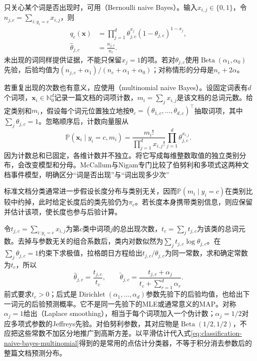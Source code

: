 只关心某个词是否出现时，可用（Bernoulli naive Bayes）。输入$x_{i,j}\in\{0,1\}$，令$n_{j,c}=\sum_{i:y_i=c}x_{i,j}$，则
\begin{equation}
  \label{eq:classification-naive-bayes-bernoulli}
  \begin{aligned}
    q_c(\bm{x})
      &=\prod_{j=1}^{d}
        \theta_{j,c}^{x_j}(1-\theta_{j,c})^{1-x_j},\\
    \hat\theta_{j,c}&=\frac{n_{j,c}}{n_c}.
  \end{aligned}
\end{equation}
未出现的词同样提供证据，不能只保留$x_j=1$的项。若对$\theta_{j,c}$使用$\operatorname{Beta}(\alpha_1,\alpha_0)$先验，后验均值为$(n_{j,c}+\alpha_1)/(n_c+\alpha_1+\alpha_0)$；对称情形的分母是$n_c+2\alpha$。

若重复出现的次数也有意义，应使用（multinomial naive Bayes）。设固定词表有$d$个词项，$\bm{x}_i\in\mathbb{N}_0^d$记录一篇文档的词项计数，$m_i=\sum_jx_{i,j}$是该文档的总词元数。给定类别和$m_i$，假设每个词元位置独立地按$\bm{\theta}_c=(\theta_{1,c},\ldots,\theta_{d,c})^{\top}$抽取词项，其中$\sum_j\theta_{j,c}=1$。忽略顺序后，计数向量服从
\begin{equation}
  \label{eq:classification-naive-bayes-multinomial}
  \mathbb{P}(\bm{x}_i\mid y_i=c,m_i)
  =\frac{m_i!}{\prod_{j=1}^{d}x_{i,j}!}
    \prod_{j=1}^{d}\theta_{j,c}^{x_{i,j}}.
\end{equation}
因为计数总和已固定，各维计数并不独立。将它写成每维整数取值的独立类别分布，会改变模型和分母。McCallum与Nigam专门比较了伯努利和多项式这两种文档事件模型，明确区分“词是否出现”与“词出现多少次”

标准文档分类通常进一步假设长度分布与类别无关，因而$\mathbb{P}(m_i\mid y_i=c)$在类别比较中约掉，此时给定长度后的类先验仍为$\pi_c$。若长度本身携带类别信息，则应保留并估计该项，使长度也参与后验计算。

令$t_{j,c}=\sum_{i:y_i=c}x_{i,j}$为第$c$类中词项$j$的总出现次数，$t_c=\sum_jt_{j,c}$为该类的总词元数。去掉与参数无关的组合系数后，类内对数似然为$\sum_jt_{j,c}\log\theta_{j,c}$。在$\sum_j\theta_{j,c}=1$约束下求极值，拉格朗日方程给出$t_{j,c}/\theta_{j,c}$为同一常数，求和确定常数为$t_c$，所以
\begin{equation}
  \label{eq:classification-naive-bayes-smoothing}
  \hat\theta_{j,c}=\frac{t_{j,c}}{t_c},
  \qquad
  \tilde\theta_{j,c}
  =\frac{t_{j,c}+\alpha_j}
         {t_c+\sum_{r=1}^{d}\alpha_r}.
\end{equation}
前式要求$t_c>0$；后式是$\operatorname{Dirichlet}(\alpha_1,\ldots,\alpha_d)$参数先验下的后验均值，也给出下一词元的后验预测概率。它不是同一先验下的MLE或通常意义的MAP。对称$\alpha_j=1$给出（Laplace smoothing），相当于每个词项加入一个伪计数；$\alpha_j=1/2$对应多项式参数的Jeffreys先验。对伯努利参数，其对应物是$\operatorname{Beta}(1/2,1/2)$，不应把这些常数不加区分地推广到高斯方差。以平滑估计代入式\eqref{eq:classification-naive-bayes-multinomial}得到的是常用的点估计分类器，不等于积分消去参数后的整篇文档预测分布。

